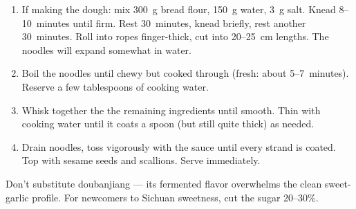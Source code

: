 \label{tian-shui-mian}

\begin{ingredients}
\end{ingredients}


\begin{recipe}
  \begin{enumerate}

  \item If making the dough: mix 300~g bread flour, 150~g water, 3~g
    salt.  Knead 8--10~minutes until firm. Rest 30~minutes, knead
    briefly, rest another 30~minutes. Roll into ropes finger-thick,
    cut into 20--25~cm lengths.  The noodles will expand somewhat in
    water.

  \item Boil the noodles until chewy but cooked through (fresh: about
    5--7~minutes). Reserve a few tablespoons of cooking water.

  \item Whisk together the the remaining ingredients until smooth.
    Thin with cooking water until it coats a spoon (but still quite
    thick) as needed.

  \item Drain noodles, toss vigorously with the sauce until every
    strand is coated. Top with sesame seeds and scallions. Serve
    immediately.

  \end{enumerate}
\end{recipe}

\notes{} Don't substitute doubanjiang --- its fermented flavor
overwhelms the clean sweet-garlic profile. For newcomers to Sichuan
sweetness, cut the sugar 20--30\%.

